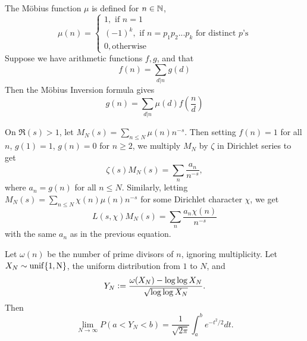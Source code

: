 \begin{theorem}
	The M\"obius function $\mu$ is defined for $n\in\mathbb{N}$,
	\[
		\mu(n) = \begin{cases}
			1, \textrm{ if } n=1\\
			(-1)^k, \textrm{ if }n=p_1p_2...p_k\textrm{ for distinct }p\textrm{'s}\\
			0, \textrm {otherwise}
		\end{cases}
	\]
	Suppose we have arithmetic functions $f,g$, and that\[
		f(n) = \sum_{d|n} g(d)
	\]
	Then the M\"obius Inversion formula gives 
	\[
		g(n) = \sum_{d|n} \mu(d) f\left(\frac{n}{d}\right)
	\]
\end{theorem}
\begin{example}
	On $\Re(s)>1$, let $M_N(s) = \sum_{n\leq N} \mu(n)n^{-s}$.
	Then setting $f(n)=1$ for all $n$, $g(1)=1$, $g(n)=0$ for $n\geq 2$, we multiply $M_N$ by $\zeta$ in Dirichlet series to get\[
		\zeta(s)M_N(s) = \sum_{n} \frac{a_n}{n^{-s}},
	\]
	where $a_n=g(n)$ for all $n\leq N$.
	Similarly, letting $M_N(s) = \sum_{n\leq N} \chi(n) \mu(n) n^{-s}$ for some Dirichlet character $\chi$,
	we get \[
		L(s,\chi)M_N(s) = \sum_{n} \frac{a_n\chi(n)}{n^{-s}}
	\]
	with the same $a_n$ as in the previous equation.
\end{example}
\begin{theorem}
	Let $\omega(n)$ be the number of prime divisors of $n$, ignoring multiplicity. Let $X_N\sim \rm{unif}\{1,N\}$, the uniform distribution from $1$ to $N$, and
	\[
	Y_N\mathrel{\mathop:}= \frac{\omega(X_N)-\log\log X_N}{\sqrt{\log \log X_N}}.
	\] 
	Then \[
	\lim_{N\to\infty} P(a<Y_N<b) = \frac{1}{\sqrt{2\pi}}\int_a^b e^{-t^2/2}dt.
	\]
\end{theorem}
